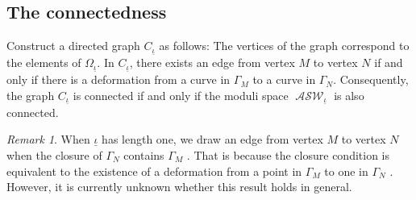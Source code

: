 \documentclass{compositio}
\theoremstyle{remark}
\theoremstyle{remark}
\newtheorem{remark}[theorem]{Remark}
\DeclareMathOperator{\ASW}{\mathcal{ASW}}
\begin{document}
\subsection{The connectedness}
Construct a directed graph $C_{\underline{\iota}}$ as follows: The vertices of the graph correspond to the elements of $\Omega_{\underline{\iota}}$. In $C_{\underline{\iota}}$, there exists an edge from vertex $M$ to vertex $N$ if and only if there is a deformation from a curve in $\Gamma_M$ to a curve in $\Gamma_N$. Consequently, the graph $C_{\underline{\iota}}$ is connected if and only if the moduli space $\ASW_{\underline{\iota}}$ is also connected.

\begin{remark}
When $\underline{\iota}$ has length one, we draw an edge from vertex $M$ to vertex $N$ when the closure of $\Gamma_N$ contains $\Gamma_M$ \cite[\S 3.2]{DANG2020398}. That is because the closure condition is equivalent to the existence of a deformation from a point in $\Gamma_M$ to one in $\Gamma_N$ \cite[Corollary 3.6]{DANG2020398}. However, it is currently unknown whether this result holds in general.
\end{remark}
\end{document}
